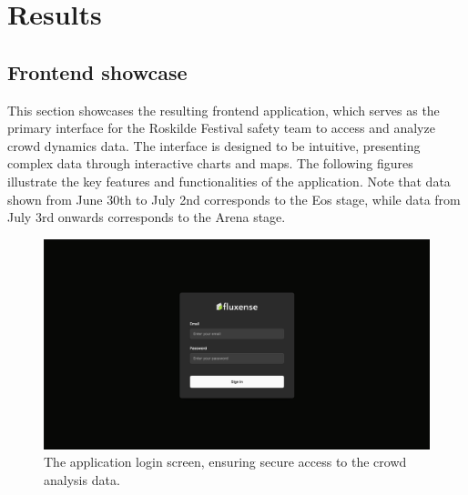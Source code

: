 \chapter{Results}
\label{chap:results}

\section{Frontend showcase}
\label{sec:frontend-showcase}

This section showcases the resulting frontend application, which serves as the primary interface for the Roskilde Festival safety team to access and analyze crowd dynamics data. The interface is designed to be intuitive, presenting complex data through interactive charts and maps. The following figures illustrate the key features and functionalities of the application. Note that data shown from June 30th to July 2nd corresponds to the Eos stage, while data from July 3rd onwards corresponds to the Arena stage.

\begin{figure}[ht]
  \centering
  \includegraphics[width=\textwidth]{Pictures/Misc/Frontend/login.png}
  \caption{The application login screen, ensuring secure access to the crowd analysis data.}
\end{figure}

